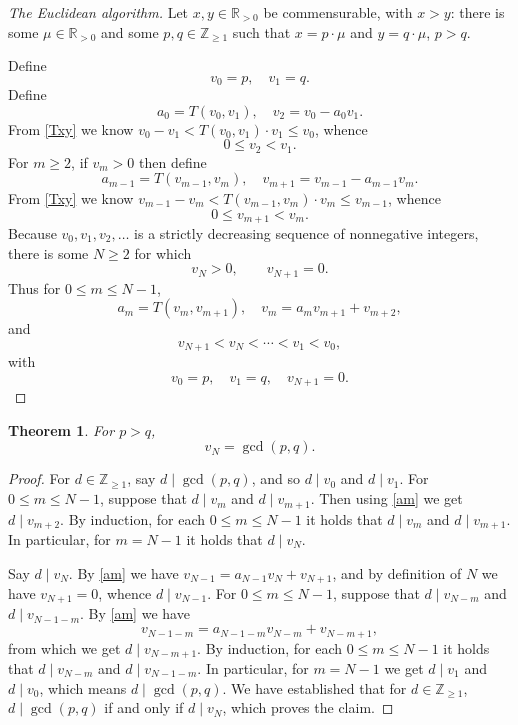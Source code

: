 \documentclass{article}
\newtheorem{theorem}{Theorem}
\begin{document}
\begin{proof}[The Euclidean algorithm]
Let $x,y \in \mathbb{R}_{>0}$ be commensurable, with $x>y$: there is some $\mu \in \mathbb{R}_{>0}$ and some
$p,q \in \mathbb{Z}_{\geq 1}$ such that $x=p\cdot \mu$ and $y = q \cdot \mu$, $p>q$.

Define 
\[
v_0=p, \quad v_1=q.
\]  
Define
\[
a_0=T(v_0,v_1),\quad v_2 = v_0-a_0v_1.
\]
From \eqref{Txy} we know
$v_0-v_1<T(v_0,v_1) \cdot v_1 \leq v_0$, whence
\[
0 \leq v_2 < v_1.
\] 
For $m \geq 2$, if $v_m > 0$ then define
\[
a_{m-1} =T(v_{m-1},v_m),\quad v_{m+1} = v_{m-1} - a_{m-1} v_m.
\] 
From \eqref{Txy} we know
$v_{m-1}-v_m<T(v_{m-1},v_m) \cdot v_m \leq v_{m-1}$, whence
\[
0 \leq v_{m+1} < v_m.
\]
Because $v_0,v_1,v_2,\ldots$ is a strictly decreasing sequence of nonnegative integers, there is some $N \geq 2$ for which
\[
v_N > 0,\qquad v_{N+1}=0.
\]
Thus
for $0 \leq m \leq N-1$,
\begin{equation}
a_m = T(v_m,v_{m+1}),\quad v_m = a_m v_{m+1} + v_{m+2},
\label{am}
\end{equation}
and
\[
v_{N+1} < v_N < \cdots < v_1 < v_0,
\]
with
\[
v_0=p,\quad v_1=q,\quad v_{N+1}=0.
\]
\end{proof}


\begin{theorem}
For $p>q$,
\[
v_N=\gcd(p,q).
\]
\end{theorem}
\begin{proof}
For $d \in \mathbb{Z}_{\geq 1}$, say $d \mid \gcd(p,q)$, and so
$d \mid v_0$ and $d \mid v_1$. 
For $0 \leq m \leq N-1$, suppose that $d \mid v_m$ and $d \mid v_{m+1}$. 
Then using \eqref{am}
 we get
$d \mid v_{m+2}$. 
By induction, for each $0 \leq m \leq N-1$ it holds that
$d \mid v_m$ and $d \mid v_{m+1}$. 
In particular, for $m=N-1$ it holds that $d \mid v_N$. 

Say $d \mid v_N$. By \eqref{am} we have $v_{N-1} = a_{N-1} v_N + v_{N+1}$, and by definition of $N$ we have $v_{N+1} = 0$,
whence
$d \mid v_{N-1}$. For $0 \leq m \leq N-1$, suppose that
$d \mid v_{N-m}$ and $d \mid v_{N-1-m}$.
By \eqref{am} we have
\[
v_{N-1-m} = a_{N-1-m} v_{N-m} + v_{N-m+1},
\] 
from which we get $d \mid v_{N-m+1}$. By induction, for each $0 \leq m \leq N-1$ it holds that
$d \mid v_{N-m}$ and $d \mid v_{N-1-m}$.
In particular, for $m=N-1$ we get $d \mid v_1$ and $d \mid v_0$, which means
$d \mid \gcd(p,q)$. 
We have established that for $d \in \mathbb{Z}_{\geq 1}$, $d \mid \gcd(p,q)$ if and only if $d \mid v_N$, which proves the claim.
\end{proof}
\end{document}
